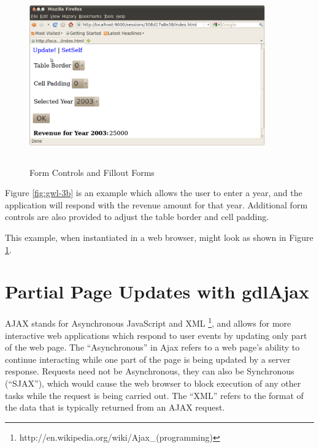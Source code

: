 \documentclass [11pt]{book}
\begin{document}
\begin{figure}
\begin{center}
\includegraphics[width=4in,height=3in]{../images/gwl-3b.png}
\end{center}

\caption{Form Controls and Fillout Forms}

\label{fig:gwl-3b-image}

\end{figure}


Figure 
\ref{fig:gwl-3b} is an example which allows the user to enter a year, and the 
application will respond with the revenue amount for that year. Additional
form controls are also provided to adjust the table border and cell padding.



This example, when instantiated in a web browser, might look as shown in Figure 
\ref{fig:gwl-3b-image}.



\section{Partial Page Updates with gdlAjax}

\label{sec:partialpageupdateswithgdlajax}



AJAX stands for Asynchronous JavaScript and
XML \footnote{http://en.wikipedia.org/wiki/Ajax\_(programming)}, and allows for more interactive web applications which
respond to user events by updating only part of the web page. The
``Asynchronous'' in Ajax refers to a web page's ability to continue
interacting while one part of the page is being updated by a server
response. Requests need not be Asynchronous, they can also be
Synchronous (``SJAX''), which would cause the web browser to block
execution of any other tasks while the request is being carried
out. The ``XML'' refers to the format of the data that is typically
returned from an AJAX request.
\end{document}
